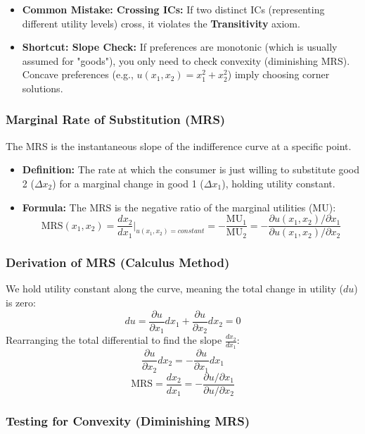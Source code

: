 \documentclass{article}
\begin{document}
\begin{itemize}
    \item \textbf{Common Mistake: Crossing ICs:} If two distinct ICs (representing different utility levels) cross, it violates the \textbf{Transitivity} axiom.

    \item \textbf{Shortcut: Slope Check:} If preferences are monotonic (which is usually assumed for "goods"), you only need to check convexity (diminishing MRS). Concave preferences (e.g., $u(x_1, x_2) = x_1^2 + x_2^2$) imply choosing corner solutions.
\end{itemize}

\subsubsection*{Marginal Rate of Substitution (MRS)}

The MRS is the instantaneous slope of the indifference curve at a specific point.

\begin{itemize}
    \item \textbf{Definition:} The rate at which the consumer is just willing to substitute good 2 ($\Delta x_2$) for a marginal change in good 1 ($\Delta x_1$), holding utility constant.

    \item \textbf{Formula:} The MRS is the negative ratio of the marginal utilities (MU): \[\text{MRS}(x_1, x_2) = \frac{dx_2}{dx_1} \bigg\rvert_{u(x_1, x_2)=constant} = -\frac{\text{MU}_1}{\text{MU}_2} = -\frac{\partial u(x_1, x_2)/\partial x_1}{\partial u(x_1, x_2)/\partial x_2}\]
\end{itemize}

\subsubsection*{Derivation of MRS (Calculus Method)}

We hold utility constant along the curve, meaning the total change in utility ($du$) is zero: 
\[du = \frac{\partial u}{\partial x_1} dx_1 + \frac{\partial u}{\partial x_2} dx_2 = 0\] 
Rearranging the total differential to find the slope $\frac{dx_2}{dx_1}:$ \[\frac{\partial u}{\partial x_2} dx_2 = -\frac{\partial u}{\partial x_1} dx_1\] \[\text{MRS} = \frac{dx_2}{dx_1} = -\frac{\partial u/\partial x_1}{\partial u/\partial x_2}\]

\subsubsection*{Testing for Convexity (Diminishing MRS)}
\end{document}
